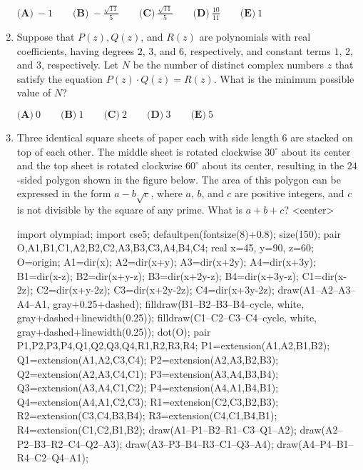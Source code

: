 \documentclass{article}
\begin{document}
\begin{enumerate}[label=\arabic*., itemsep=0.5em]
$\textbf{(A)}\ {-}1 \qquad\textbf{(B)}\ {-}\frac{\sqrt{11}}{5} \qquad\textbf{(C)}\ \frac{\sqrt{11}}{5} \qquad\textbf{(D)}\
\frac{10}{11} \qquad\textbf{(E)}\ 1$\par \vspace{0.5em}\item Suppose that $P(z), Q(z)$, and $R(z)$ are polynomials with real coefficients, having degrees $2$, $3$, and $6$, respectively, and constant terms $1$, $2$, and $3$, respectively. Let $N$ be the number of distinct complex numbers $z$ that satisfy the equation $P(z) \cdot Q(z)=R(z)$. What is the minimum possible value of $N$?

$\textbf{(A)}\: 0\qquad\textbf{(B)} \: 1\qquad\textbf{(C)} \: 2\qquad\textbf{(D)} \: 3\qquad\textbf{(E)} \: 5$\par \vspace{0.5em}\item Three identical square sheets of paper each with side length $6$ are stacked on top of each other. The middle sheet is rotated clockwise $30^\circ$ about its center and the top sheet is rotated clockwise $60^\circ$ about its center, resulting in the $24$-sided polygon shown in the figure below. The area of this polygon can be expressed in the form $a-b\sqrt{c}$, where $a$, $b$, and $c$ are positive integers, and $c$ is not divisible by the square of any prime. What is $a+b+c$?
<center>
\begin{center}
\begin{asy}
import olympiad;
import cse5;
defaultpen(fontsize(8)+0.8); size(150);
pair O,A1,B1,C1,A2,B2,C2,A3,B3,C3,A4,B4,C4;
real x=45, y=90, z=60; O=origin; 
A1=dir(x); A2=dir(x+y); A3=dir(x+2y); A4=dir(x+3y);
B1=dir(x-z); B2=dir(x+y-z); B3=dir(x+2y-z); B4=dir(x+3y-z);
C1=dir(x-2z); C2=dir(x+y-2z); C3=dir(x+2y-2z); C4=dir(x+3y-2z);
draw(A1--A2--A3--A4--A1, gray+0.25+dashed);
filldraw(B1--B2--B3--B4--cycle, white, gray+dashed+linewidth(0.25));
filldraw(C1--C2--C3--C4--cycle, white, gray+dashed+linewidth(0.25));
dot(O);
pair P1,P2,P3,P4,Q1,Q2,Q3,Q4,R1,R2,R3,R4;
P1=extension(A1,A2,B1,B2); Q1=extension(A1,A2,C3,C4); 
P2=extension(A2,A3,B2,B3); Q2=extension(A2,A3,C4,C1); 
P3=extension(A3,A4,B3,B4); Q3=extension(A3,A4,C1,C2); 
P4=extension(A4,A1,B4,B1); Q4=extension(A4,A1,C2,C3); 
R1=extension(C2,C3,B2,B3); R2=extension(C3,C4,B3,B4); 
R3=extension(C4,C1,B4,B1); R4=extension(C1,C2,B1,B2);
draw(A1--P1--B2--R1--C3--Q1--A2);
draw(A2--P2--B3--R2--C4--Q2--A3);
draw(A3--P3--B4--R3--C1--Q3--A4);
draw(A4--P4--B1--R4--C2--Q4--A1);
\end{asy}
\end{center}

\end{enumerate}
\end{document}
